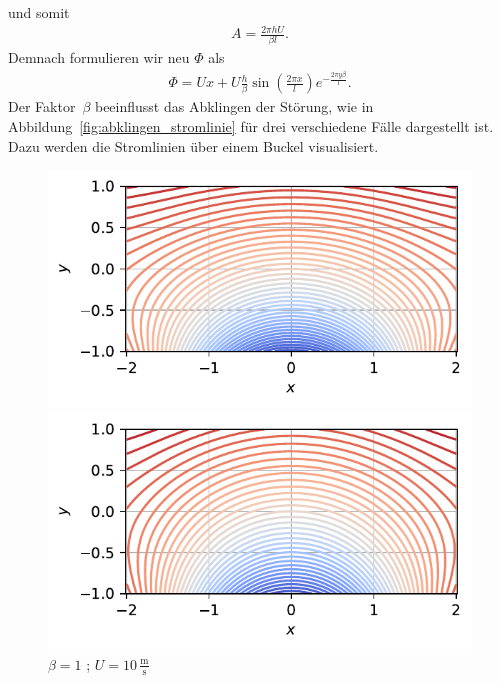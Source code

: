 und somit 
\begin{align*}
    A
    =
    \frac{2 \pi h U}{\beta l}.
\end{align*}
Demnach formulieren wir neu $\Phi$ als
\begin{align*}
    \Phi
    =
    U x + U \frac{h}{\beta} \sin\left(\frac{2 \pi x}{l}\right)
     e^{-\frac{2 \pi y \beta}{l}}.
\end{align*}
Der Faktor~$\beta$ beeinflusst das Abklingen der Störung,
wie in Abbildung~\ref{fig:abklingen_stromlinie} 
für drei verschiedene Fälle dargestellt ist.
Dazu werden die Stromlinien über einem Buckel visualisiert.
\begin{figure}
    \centering
    \begin{minipage}[b]{0.32\textwidth}
        \centering
        \includegraphics[width=\linewidth]{papers/ueberschall/figures/abklingen_10.pdf}
        \caption*{$\beta = 1$ ; $U = 10\,\frac{\mathrm{m}}{\mathrm{s}}$}
    \end{minipage}
    \hfill
    \begin{minipage}[b]{0.32\textwidth}
        \centering
        \includegraphics[width=\linewidth]{papers/ueberschall/figures/abklingen_200.pdf}

\end{minipage}
\end{figure}
